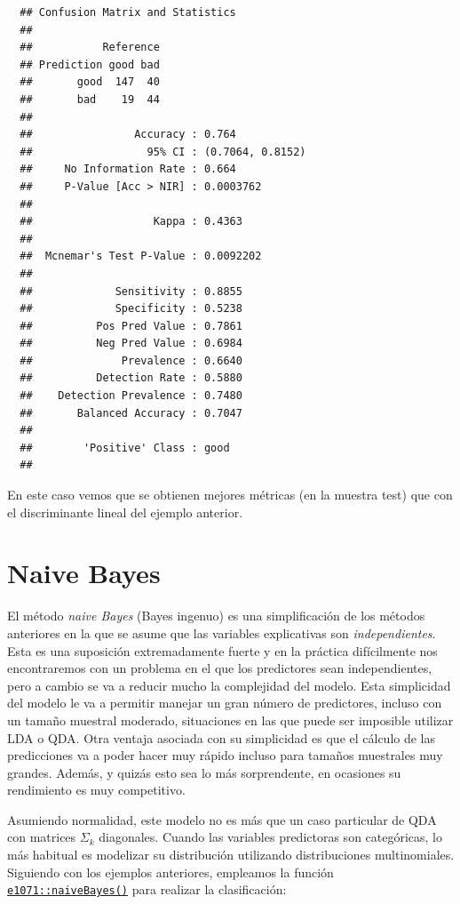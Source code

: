 \documentclass[
]{book}
\theoremstyle{break}
\theoremstyle{nonumberplain}
\begin{document}
\begin{verbatim}
  ## Confusion Matrix and Statistics
  ## 
  ##           Reference
  ## Prediction good bad
  ##       good  147  40
  ##       bad    19  44
  ##                                           
  ##                Accuracy : 0.764           
  ##                  95% CI : (0.7064, 0.8152)
  ##     No Information Rate : 0.664           
  ##     P-Value [Acc > NIR] : 0.0003762       
  ##                                           
  ##                   Kappa : 0.4363          
  ##                                           
  ##  Mcnemar's Test P-Value : 0.0092202       
  ##                                           
  ##             Sensitivity : 0.8855          
  ##             Specificity : 0.5238          
  ##          Pos Pred Value : 0.7861          
  ##          Neg Pred Value : 0.6984          
  ##              Prevalence : 0.6640          
  ##          Detection Rate : 0.5880          
  ##    Detection Prevalence : 0.7480          
  ##       Balanced Accuracy : 0.7047          
  ##                                           
  ##        'Positive' Class : good            
  ## 
\end{verbatim}

En este caso vemos que se obtienen mejores métricas (en la muestra test) que con el discriminante lineal del ejemplo
anterior.

\hypertarget{bayes}{%
\section{Naive Bayes}\label{bayes}}

El método \emph{naive Bayes} (Bayes ingenuo) es una simplificación de los métodos anteriores en la que se asume que las variables explicativas son \emph{independientes}.
Esta es una suposición extremadamente fuerte y en la práctica difícilmente nos encontraremos con un problema en el que los predictores sean independientes, pero a cambio se va a reducir mucho la complejidad del modelo.
Esta simplicidad del modelo le va a permitir manejar un gran número de predictores, incluso con un tamaño muestral moderado, situaciones en las que puede ser imposible utilizar LDA o QDA.
Otra ventaja asociada con su simplicidad es que el cálculo de las predicciones va a poder hacer muy rápido incluso para tamaños muestrales muy grandes.
Además, y quizás esto sea lo más sorprendente, en ocasiones su rendimiento es muy competitivo.

Asumiendo normalidad, este modelo no es más que un caso particular de QDA con matrices \(\Sigma_k\) diagonales.
Cuando las variables predictoras son categóricas, lo más habitual es modelizar su distribución utilizando distribuciones multinomiales.
Siguiendo con los ejemplos anteriores, empleamos la función \href{https://rdrr.io/pkg/e1071/man/naiveBayes.html}{\texttt{e1071::naiveBayes()}} para realizar la clasificación:
\end{document}
